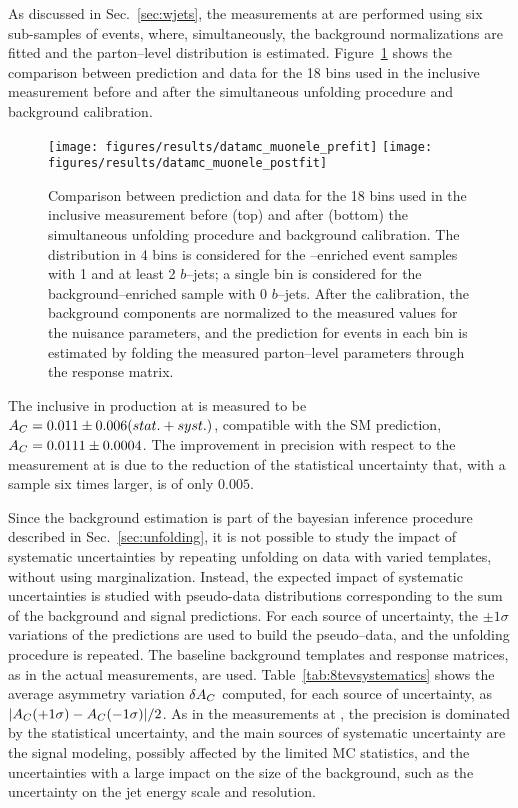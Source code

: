 As discussed in Sec.~\ref{sec:wjets}, the measurements at \eighttev{}
are performed using six sub-samples of \ljets{} events,
where, simultaneously, the background normalizations are fitted and
the parton--level \dy{} distribution is
estimated. Figure~\ref{fig:dy8tev} shows the comparison between
prediction and data for the 18 bins used in the inclusive \ac{}
measurement before and after the simultaneous unfolding procedure and
background calibration.
\begin{figure}[!htb]\centering
  \texttt{[image: figures/results/datamc\_muonele\_prefit]} 
  \texttt{[image: figures/results/datamc\_muonele\_postfit]} 
  \caption{Comparison between prediction and data for the 18 bins used
  in the inclusive \ac{} measurement before (top) and after (bottom)
  the simultaneous unfolding procedure and background calibration. The
  \dy{} distribution in 4 bins is considered for the
  \ttbar{}--enriched event samples with 1 and at least 2 $b$--jets; a
  single bin is considered for the background--enriched sample with 0
  $b$--jets. After the calibration, the background components are
  normalized to the measured values for the nuisance parameters, and
  the prediction for \ttbar{} events in each bin is estimated by
  folding the measured parton--level parameters through the response
  matrix.}
  \label{fig:dy8tev}
\end{figure}
The inclusive \ac{} in \ttbar{} production at \eighttev{} is measured to be
$A_C{}= 0.011\pm0.006(stat.+syst.)$, compatible with the SM prediction,
$A_C{}=0.0111\pm0.0004$. The improvement in precision with respect to
the measurement at \seventev{} is due to the reduction of the
statistical uncertainty that, with a \ttbar{} sample six times larger,
is of only $0.005$. 

Since the background estimation is part of the bayesian inference
procedure described in Sec.~\ref{sec:unfolding}, it is not possible to
study the impact of systematic uncertainties by repeating unfolding on data with
varied templates, without using marginalization. Instead, the expected
impact of systematic uncertainties is studied with pseudo-data distributions
corresponding to the sum of the background and signal predictions.
For each source of uncertainty, the $\pm{}1\sigma$ variations of the
predictions are used to build the pseudo--data, and the unfolding
procedure is repeated. The baseline background templates and response
matrices, as in the actual measurements, are used.
Table~\ref{tab:8tevsystematics} shows the average asymmetry variation
$\delta{\ensuremath{A_C}{}}$ computed, for each source of uncertainty, as
$|A_C{}(+1\sigma)-A_C{}(-1\sigma)|/2$.
As in the measurements at \seventev{}, the precision is dominated by
the statistical uncertainty, and the main sources of systematic
uncertainty are the signal modeling, possibly affected by the limited
MC statistics, and the uncertainties with a large impact on the size of the
\wjets{} background, such as the uncertainty on the jet energy scale
and resolution. 

